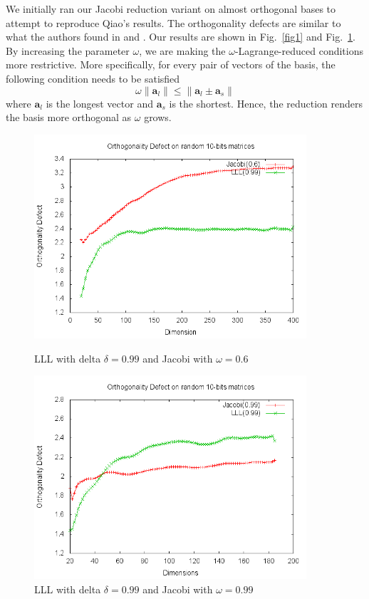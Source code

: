 \documentclass[10pt, a4paper]{article}
\renewcommand{\vec}[1]{\mathbf{#1}}
\begin{document}
We initially ran our Jacobi reduction variant on almost orthogonal bases to attempt to reproduce Qiao's results. The orthogonality defects are similar to what the authors found in \cite{tian2014hybrid} and \cite{fastJacobi}. Our results are shown in Fig.~\ref{fig1} and Fig.~\ref{fig2}. By increasing the parameter $\omega$, we are making the $\omega$-Lagrange-reduced conditions more restrictive. More specifically, for every pair of vectors of the basis, the following condition needs to be satisfied
\[
 \omega \| \vec{a}_l \| \leq \|\vec{a}_l \pm \vec{a}_s \|
\] where $\vec{a}_l$ is the longest vector and $\vec{a}_s$ is the shortest. Hence, the reduction renders the basis more orthogonal as $\omega$ grows.

\begin{figure}[H]
\begin{minipage}{.45\textwidth}
  \centering
    \includegraphics[width=0.9\textwidth]{results-graphs/random-matrix-omega-06defect.png}
      \caption{LLL with delta $\delta = 0.99$ and Jacobi with $\omega = 0.6$}
  \label{fig1}
\end{minipage}
\hspace{.05\textwidth}
\begin{minipage}{.45\textwidth}

  \centering
    \includegraphics[width=0.9\textwidth]{results-graphs/random-matrix-omega-09defect.png}
    
  \caption{LLL with delta $\delta = 0.99$ and Jacobi with $\omega = 0.99$}
  \label{fig2}
\end{minipage}
\end{figure}
\end{document}
